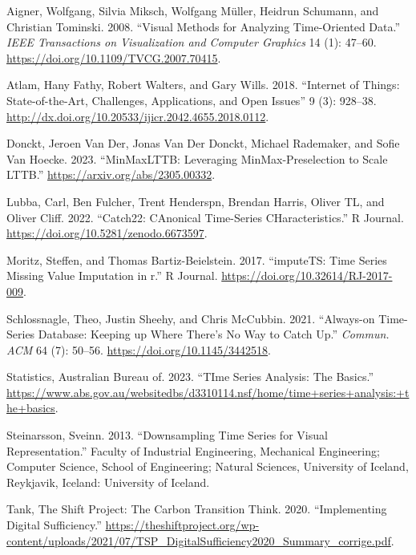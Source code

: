 \documentclass[
]{article}
\newlength{\cslhangindent}
\newlength{\cslentryspacingunit} %
\newenvironment{CSLReferences}[2] %
 {%
  \setlength{\parindent}{0pt}
  \ifodd #1
  \let\oldpar\par
  \def\par{\hangindent=\cslhangindent\oldpar}
  \fi
  \setlength{\parskip}{#2\cslentryspacingunit}
 }%
 {}
\begin{document}
\hypertarget{refs}{}
\begin{CSLReferences}{1}{0}
\leavevmode{}%
Aigner, Wolfgang, Silvia Miksch, Wolfgang Müller, Heidrun Schumann, and
Christian Tominski. 2008. {``Visual Methods for Analyzing Time-Oriented
Data.''} \emph{IEEE Transactions on Visualization and Computer Graphics}
14 (1): 47--60. \url{https://doi.org/10.1109/TVCG.2007.70415}.

\leavevmode{}%
Atlam, Hany Fathy, Robert Walters, and Gary Wills. 2018. {``Internet of
Things: State-of-the-Art, Challenges, Applications, and Open Issues''} 9
(3): 928--38.
\url{http://dx.doi.org/10.20533/ijicr.2042.4655.2018.0112}.

\leavevmode{}%
Donckt, Jeroen Van Der, Jonas Van Der Donckt, Michael Rademaker, and
Sofie Van Hoecke. 2023. {``MinMaxLTTB: Leveraging MinMax-Preselection to
Scale LTTB.''} \url{https://arxiv.org/abs/2305.00332}.

\leavevmode{}%
Lubba, Carl, Ben Fulcher, Trent Henderspn, Brendan Harris, Oliver TL,
and Oliver Cliff. 2022. {``Catch22: CAnonical Time-Series
CHaracteristics.''} R Journal.
\url{https://doi.org/10.5281/zenodo.6673597}.

\leavevmode{}%
Moritz, Steffen, and Thomas Bartiz-Beielstein. 2017. {``imputeTS: Time
Series Missing Value Imputation in r.''} R Journal.
\url{https://doi.org/10.32614/RJ-2017-009}.

\leavevmode{}%
Schlossnagle, Theo, Justin Sheehy, and Chris McCubbin. 2021.
{``Always-on Time-Series Database: Keeping up Where There's No Way to
Catch Up.''} \emph{Commun. ACM} 64 (7): 50--56.
\url{https://doi.org/10.1145/3442518}.

\leavevmode{}%
Statistics, Australian Bureau of. 2023. {``TIme Series Analysis: The
Basics.''}
\url{https://www.abs.gov.au/websitedbs/d3310114.nsf/home/time+series+analysis:+the+basics}.

\leavevmode{}%
Steinarsson, Sveinn. 2013. {``Downsampling Time Series for Visual
Representation.''} Faculty of Industrial Engineering, Mechanical
Engineering; Computer Science, School of Engineering; Natural Sciences,
University of Iceland, Reykjavik, Iceland: University of Iceland.

\leavevmode{}%
Tank, The Shift Project: The Carbon Transition Think. 2020.
{``Implementing Digital Sufficiency.''}
\url{https://theshiftproject.org/wp-content/uploads/2021/07/TSP_DigitalSufficiency2020_Summary_corrige.pdf}.


\end{CSLReferences}
\end{document}

